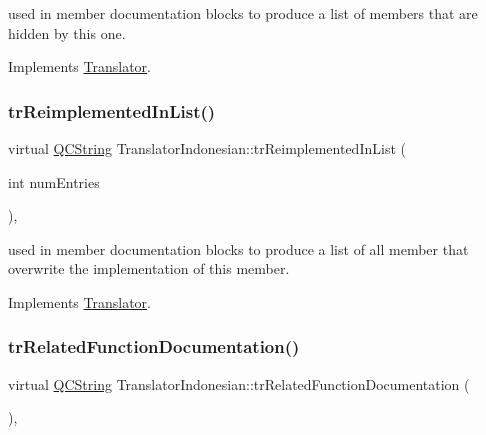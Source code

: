 used in member documentation blocks to produce a list of members that are hidden by this one. 

Implements \mbox{\hyperlink{class_translator}{Translator}}.

\mbox{\label{class_translator_indonesian_a01beb379b3634a84e87d333ffd97070e}} 
\subsubsection{\texorpdfstring{trReimplementedInList()}{trReimplementedInList()}}
{\footnotesize\ttfamily virtual \mbox{\hyperlink{class_q_c_string}{Q\+C\+String}} Translator\+Indonesian\+::tr\+Reimplemented\+In\+List (\begin{DoxyParamCaption}\item[{int}]{num\+Entries }\end{DoxyParamCaption})\hspace{0.3cm}{\ttfamily [inline]}, {\ttfamily [virtual]}}

used in member documentation blocks to produce a list of all member that overwrite the implementation of this member. 

Implements \mbox{\hyperlink{class_translator}{Translator}}.

\mbox{\label{class_translator_indonesian_a04deb193123b0d3544b197f0339d612f}} 
\subsubsection{\texorpdfstring{trRelatedFunctionDocumentation()}{trRelatedFunctionDocumentation()}}
{\footnotesize\ttfamily virtual \mbox{\hyperlink{class_q_c_string}{Q\+C\+String}} Translator\+Indonesian\+::tr\+Related\+Function\+Documentation (\begin{DoxyParamCaption}{ }\end{DoxyParamCaption})\hspace{0.3cm}{\ttfamily [inline]}, {\ttfamily [virtual]}}

